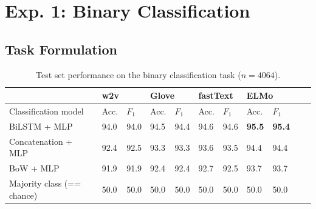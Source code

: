 \documentclass[letterpaper]{article} %
\begin{document}
\section{Exp. 1: Binary Classification}

\subsection{Task Formulation} 
\label{ex1:data}

\begin{table}[h]
	\centering
	\begin{tabular}{@{}lllllllllll@{}}
		\toprule
		& \multicolumn{2}{l}{w2v} &\multicolumn{2}{l}{Glove}& \multicolumn{2}{l}{fastText} & \multicolumn{2}{l}{ELMo} \\ \midrule
		Classification model       & Acc. & $F_1$ & Acc. & $F_1$ & Acc. & $F_1$ & Acc. & $F_1$   \\ \midrule
		BiLSTM + MLP &   94.0  &  94.0 \hspace{0.8cm} &  94.5 & 94.4 \hspace{0.8cm} & 94.6 & 94.6 \hspace{0.8cm} & \textbf{95.5}& \textbf{95.4} \\
		Concatenation + MLP & 92.4 & 92.5 & 93.3& 93.3& 93.6 & 93.5 & 94.4 & 94.4\\
		BoW + MLP & 91.9& 91.9 & 92.4 &92.4 & 92.7& 92.5& 93.7 & 93.7\\
		Majority class (== chance)       & 50.0      & 50.0 &  50.0 & 50.0  & 50.0 &50.0 & 50.0 & 50.0\\
		\bottomrule
	\end{tabular}
	\caption{Test set performance on the binary classification task  ($n=4064$).}
	\label{ex1:accuracy}
\end{table}
\end{document}
